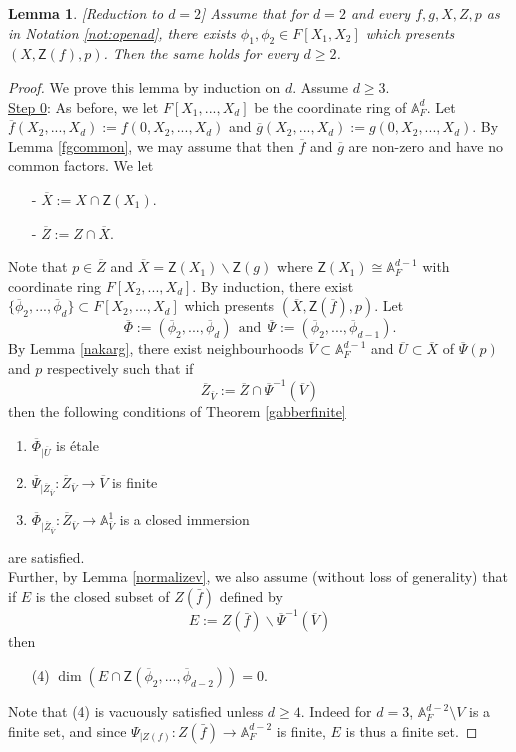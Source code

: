 \documentclass[10pt]{amsart}
\theoremstyle{plain}
\newtheorem{lemma}[thm]{Lemma}
\theoremstyle{definition}
\newcommand{\intersection}{\cap}
\newcommand{\A}{{\mathbb A}}
\let\syn\mathsf
\begin{document}
\begin{lemma}\label{dto2} [Reduction to $d=2$] Assume that for $d=2$ and  every $f,g,X,Z,p$ as in Notation \ref{not:openad}, there exists $\phi_1,\phi_2\in F[X_1,X_2]$ which presents $(X,\syn{Z}(f),p)$. Then the same holds for every $d\geq 2$.  
\end{lemma}
\begin{proof}We prove this lemma by induction on $d$. Assume $d\geq 3$. \\

\noindent \underline{Step 0}: 
As before, we let $F[X_1,...,X_d]$ be the coordinate ring of $\A^d_F$. 
Let $\overline{f}(X_2,...,X_d):=f(0,X_2,...,X_d)$ and $\overline{g}(X_2,...,X_d):=g(0,X_2,...,X_d)$. By Lemma \ref{fgcommon}, we may assume that 
 then $\overline{f}$ and $\overline{g}$ are non-zero and have no common factors. 
We let 
\begin{enumerate}
\item[-] $\overline{X}:= X\intersection \syn{Z}(X_1)$.
\item[-] $\overline{Z}:=Z\intersection \overline{X}$.
\end{enumerate}
Note that $p\in \overline{Z}$ and $\overline{X}=\syn{Z}(X_1) \backslash \syn{Z}(g)$ where $\syn{Z}(X_1)\cong \A^{d-1}_F$ with coordinate ring $F[X_2,...,X_d]$. By induction, there exist $\{\overline{\phi}_2,...,\overline{\phi}_d\}\subset F[X_2,...,X_d]$ which presents $(\overline{X},\syn{Z}(\overline{f}),p)$. Let 
$$\overline{\Phi}:=(\overline{\phi}_2,...,\overline{\phi}_d) \ \ \text{and} \ \  \overline{\Psi}:=(\overline{\phi}_2,...,\overline{\phi}_{d-1}).$$ 
By Lemma \ref{nakarg}, there exist neighbourhoods $\overline{V}\subset \A^{d-1}_F$ and $\overline{U}\subset \overline{X}$ of $\overline{\Psi}(p)$ and $p$ respectively such that if 
$$ \overline{Z}_{\overline{V}}:= \overline{Z}\intersection \overline{\Psi}^{-1}(\overline{V})$$ 
then the following conditions of Theorem \ref{gabberfinite} 
\begin{enumerate}
\item $\overline{\Phi}_{|\overline{U}}$ is \'{e}tale 
\item $\overline{\Psi}_{|\overline{Z}_{\overline{V}}} : \overline{Z}_{\overline{V}} \to \overline{V}$ is finite 
\item $\overline{\Phi}_{|\overline{Z}_{\overline{V}} } : \overline{Z}_{\overline{V}} \to \A^1_{\overline{V}}$ is a closed immersion 
\end{enumerate}
{are satisfied.}\\
Further, by Lemma \ref{normalizev}, we also assume (without loss of generality) that if $E$ is the closed subset of ${Z(\bar{f})}$ defined by 
$$ {E:=Z(\bar{f})\backslash \overline{\Psi}^{-1}(\overline{V})} $$ 
then 
\begin{enumerate}
\item[(4)] $ \dim( E  \intersection \syn{Z}(\overline{\phi}_2,...,\overline{\phi}_{d-2}) ) = 0.$
\end{enumerate}
Note that (4) is vacuously satisfied unless $d\geq 4$. Indeed for $d = 3$,  $\A^{d-2}_{F}\setminus V$ is a finite set, and since $\Psi_{|Z(f)}:Z(\bar{f})\rightarrow \A^{d-2}_F$ is finite, $E$ is thus a
finite set.


\end{proof}
\end{document}
